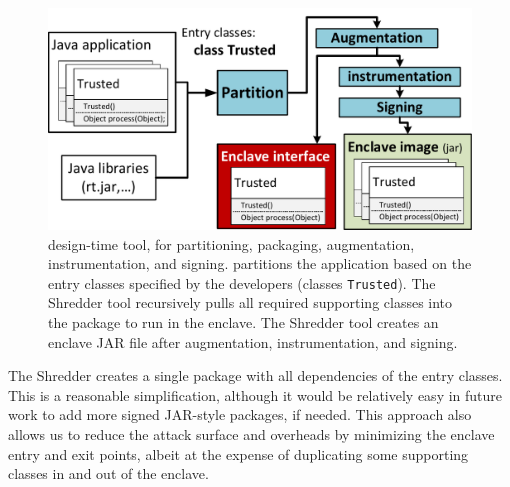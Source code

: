 \begin{figure}[t!]
\centering
\includegraphics[width=\linewidth]{civet/figures/building-tool.pdf}
\caption{\systemname{} design-time tool, for partitioning, packaging, augmentation, instrumentation, and signing.
\systemname{} partitions the \java{} application based on the entry classes
specified by the developers (classes {\tt Trusted}).
The Shredder tool recursively pulls all required supporting classes into the 
package to run in the enclave.
The Shredder tool creates an enclave JAR file after augmentation,
instrumentation, and signing.}
\label{fig:builder}
\end{figure}

The Shredder creates a single package with all dependencies of the
entry classes.
This is a reasonable simplification, although 
it would be relatively easy in future work to add more signed JAR-style packages,
if needed.
This approach also allows us to 
reduce the attack surface and overheads by minimizing the 
enclave entry and exit points, albeit at the expense of duplicating some supporting
classes in and out of the enclave.




